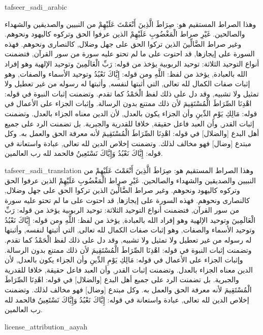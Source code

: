 \begin{taggedblock}{tafseer_sadi_arabic}
\begin{Arabic}
وهذا الصراط المستقيم هو:
{ صِرَاطَ الَّذِينَ أَنْعَمْتَ عَلَيْهِمْ }
من النبيين والصديقين والشهداء والصالحين.
{ غَيْرِ }
صراط
{ الْمَغْضُوبِ عَلَيْهِمْ }
الذين عرفوا الحق وتركوه كاليهود ونحوهم. وغير صراط
{ الضَّالِّينَ }
الذين تركوا الحق على جهل وضلال, كالنصارى ونحوهم. فهذه السورة على إيجازها, قد احتوت على ما لم تحتو عليه سورة من سور القرآن, فتضمنت أنواع التوحيد الثلاثة: توحيد الربوبية يؤخذ من قوله:
{ رَبِّ الْعَالَمِينَ }
وتوحيد الإلهية وهو إفراد الله بالعبادة, يؤخذ من لفظ:
{ اللَّهِ }
ومن قوله:
{ إِيَّاكَ نَعْبُدُ }
وتوحيد الأسماء والصفات, وهو إثبات صفات الكمال لله تعالى, التي أثبتها لنفسه, وأثبتها له رسوله من غير تعطيل ولا تمثيل ولا تشبيه, وقد دل على ذلك لفظ
{ الْحَمْدُ }
كما تقدم. وتضمنت إثبات النبوة في قوله:
{ اهْدِنَا الصِّرَاطَ الْمُسْتَقِيمَ }
لأن ذلك ممتنع بدون الرسالة. وإثبات الجزاء على الأعمال في قوله:
{ مَالِكِ يَوْمِ الدِّينِ }
وأن الجزاء يكون بالعدل, لأن الدين معناه الجزاء بالعدل. وتضمنت إثبات القدر, وأن العبد فاعل حقيقة, خلافا للقدرية والجبرية. بل تضمنت الرد على جميع أهل البدع
[والضلال]
في قوله:
{ اهْدِنَا الصِّرَاطَ الْمُسْتَقِيمَ }
لأنه معرفة الحق والعمل به. وكل مبتدع
[وضال]
فهو مخالف لذلك. وتضمنت إخلاص الدين لله تعالى, عبادة واستعانة في قوله:
{ إِيَّاكَ نَعْبُدُ وَإِيَّاكَ نَسْتَعِينُ }
فالحمد لله رب العالمين.
\end{Arabic}
\end{taggedblock}
\begin{taggedblock}{tafseer_sadi_translation}
وهذا الصراط المستقيم هو:
{ صِرَاطَ الَّذِينَ أَنْعَمْتَ عَلَيْهِمْ }
من النبيين والصديقين والشهداء والصالحين.
{ غَيْرِ }
صراط
{ الْمَغْضُوبِ عَلَيْهِمْ }
الذين عرفوا الحق وتركوه كاليهود ونحوهم. وغير صراط
{ الضَّالِّينَ }
الذين تركوا الحق على جهل وضلال, كالنصارى ونحوهم. فهذه السورة على إيجازها, قد احتوت على ما لم تحتو عليه سورة من سور القرآن, فتضمنت أنواع التوحيد الثلاثة: توحيد الربوبية يؤخذ من قوله:
{ رَبِّ الْعَالَمِينَ }
وتوحيد الإلهية وهو إفراد الله بالعبادة, يؤخذ من لفظ:
{ اللَّهِ }
ومن قوله:
{ إِيَّاكَ نَعْبُدُ }
وتوحيد الأسماء والصفات, وهو إثبات صفات الكمال لله تعالى, التي أثبتها لنفسه, وأثبتها له رسوله من غير تعطيل ولا تمثيل ولا تشبيه, وقد دل على ذلك لفظ
{ الْحَمْدُ }
كما تقدم. وتضمنت إثبات النبوة في قوله:
{ اهْدِنَا الصِّرَاطَ الْمُسْتَقِيمَ }
لأن ذلك ممتنع بدون الرسالة. وإثبات الجزاء على الأعمال في قوله:
{ مَالِكِ يَوْمِ الدِّينِ }
وأن الجزاء يكون بالعدل, لأن الدين معناه الجزاء بالعدل. وتضمنت إثبات القدر, وأن العبد فاعل حقيقة, خلافا للقدرية والجبرية. بل تضمنت الرد على جميع أهل البدع
[والضلال]
في قوله:
{ اهْدِنَا الصِّرَاطَ الْمُسْتَقِيمَ }
لأنه معرفة الحق والعمل به. وكل مبتدع
[وضال]
فهو مخالف لذلك. وتضمنت إخلاص الدين لله تعالى, عبادة واستعانة في قوله:
{ إِيَّاكَ نَعْبُدُ وَإِيَّاكَ نَسْتَعِينُ }
فالحمد لله رب العالمين.
\end{taggedblock}
\begin{taggedblock}{license_attribution_aayah}

\end{taggedblock}
\begin{comment}
Please use the following for footnotes:- Sample\footnoteQ{Text of Qur'an footnote goes here.}.
Sample\footnoteT{Text of Tafseer footnote goes here.}.
\end{comment}